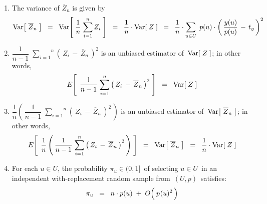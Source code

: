 \begin{theorem}
\begin{enumerate}
\item
	The variance of \;$\overline{Z}_{n}$ is given by
	\begin{equation*}
	\textnormal{Var}\!\left[\;\overline{Z}_{n}\;\right]
	\;\; = \;\;
		\textnormal{Var}\!\left[\;\dfrac{1}{n}\;\overset{n}{\underset{i=1}{\sum}}\,Z_{i}\;\right]
	\;\; = \;\;
		\dfrac{1}{n}\cdot\textnormal{Var}\!\left[\;Z\;\right]
	\;\; = \;\;
		\dfrac{1}{n} \cdot \underset{u \in U}{\sum}\;\,p(u)\cdot\left(\,\dfrac{y(u)}{p(u)}\,-\,t_{y}\,\right)^{2}
	\end{equation*}
\item
	$\dfrac{1}{n-1}\;\overset{n}{\underset{i=1}{\sum}}\left(\,Z_{i} \,-\, \overline{Z}_{n}\,\right)^{2}$\;
	is an unbiased estimator of \,$\textnormal{Var}\!\left[\;Z\;\right]$; in other words,	
	\begin{equation*}
	E\!\left[\;\,\dfrac{1}{n-1}\;\overset{n}{\underset{i=1}{\sum}}\left(\,Z_{i} \,-\, \overline{Z}_{n}\,\right)^{2}\;\right]
	\;\; = \;\;
		\textnormal{Var}\!\left[\;Z\;\right]
	\end{equation*}
\item
	$\dfrac{1}{n}\left(\,\dfrac{1}{n-1}\;\overset{n}{\underset{i=1}{\sum}}\left(\,Z_{i} \,-\, \overline{Z}_{n}\,\right)^{2}\,\right)$\;
	is an unbiased estimator of \,$\textnormal{Var}\!\left[\;\overline{Z}_{n}\;\right]$; in other words,	
	\begin{equation*}
	E\!\left[\;\,\dfrac{1}{n}\left(\,\dfrac{1}{n-1}\;\overset{n}{\underset{i=1}{\sum}}\left(\,Z_{i} \,-\, \overline{Z}_{n}\,\right)^{2}\,\right)\;\right]
	\;\; = \;\;
		\textnormal{Var}\!\left[\;\overline{Z}_{n}\;\right]
	\;\; = \;\;
		\dfrac{1}{n}\cdot\textnormal{Var}\!\left[\;Z\;\right]
	\end{equation*}
\item
	For each $u \in U$, the probability \;$\pi_{u} \in (0,1]$\, of selecting \;$u \in U$\,
	in an independent with-replacement random sample from \,$(U,p)$\, satisfies:
	\begin{equation*}
	\pi_{u}
	\;\; = \;\;
		n \cdot p(u)
		\; + \;
		O\!\left(\,\overset{{\color{white}-}}{p}(u)^{2}\,\right)
	\end{equation*}
\end{enumerate}
\end{theorem}
\proof
